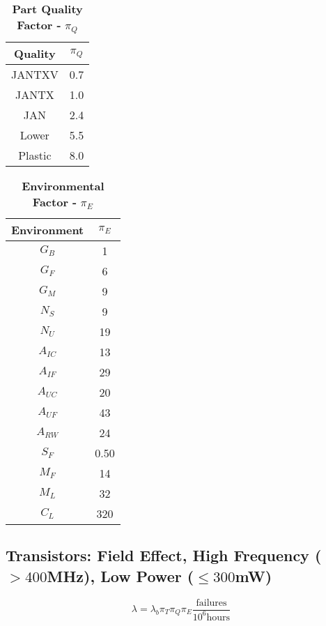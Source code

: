 \begin{table}[h]
\caption{\textbf{Part Quality  Factor -}  $\pi_{Q}$}
\label{table:qualityFactorFailRateMosLow}
\begin{tabular}{|c|c|} \hline
\rowcolor{Gray}
\textbf{Quality} & $\pi_{Q}$ \\ \hline
JANTXV & 0.7 \\ \hline
JANTX & 1.0 \\ \hline
JAN & 2.4 \\ \hline
Lower & 5.5 \\ \hline
Plastic & 8.0 \\ \hline
\end{tabular}
\end{table}


\begin{table}[h]
\caption{\textbf{Environmental Factor -} $\pi_{E}$}
\label{table:envFactorMosLow}
\begin{tabular}{|c|c|} \hline
\rowcolor{Gray}
\textbf{Environment} & $\pi_{E}$ \\ \hline
$G_{B}$ & 1 \\ \hline
$G_{F}$ & 6 \\ \hline
$G_{M}$ & 9 \\ \hline
$N_{S}$ & 9 \\ \hline
$N_{U}$ & 19 \\ \hline
$A_{IC}$ & 13 \\ \hline
$A_{IF}$ & 29 \\ \hline
$A_{UC}$ & 20 \\ \hline
$A_{UF}$ & 43 \\ \hline
$A_{RW}$ & 24 \\ \hline
$S_{F}$ & 0.50 \\ \hline
$M_{F}$ & 14 \\ \hline
$M_{L}$ & 32 \\ \hline
$C_{L}$ & 320 \\ \hline
\end{tabular}
\end{table}

\newpage

\subsection{Transistors: Field Effect, High Frequency ($> 400$MHz), Low Power ($\leq 300$mW)}
\label{subsection:transistors-field-effect-high-frequency-400mhz-low-power-300mw}

$$\lambda = \lambda_{b} \pi_{T} \pi_{Q} \pi_{E} \frac{\text{failures}}{10^{6} \text{hours}}$$


